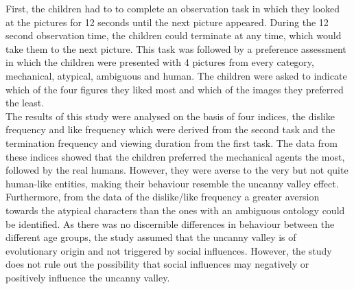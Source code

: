 First, the children had to to complete an observation task in which they looked at the pictures for 12 seconds until the next picture appeared. During the 12 second observation time, the children could terminate at any time, which would take them to the next picture. This task was followed by a preference assessment in which the children were presented with 4 pictures from every category, mechanical, atypical, ambiguous  and human. The children were asked to indicate which of the four figures they liked most and which of the images they preferred the least.\\
The results of this study were analysed on the basis of four indices, the dislike frequency and like frequency which were derived from the second task and the termination frequency and viewing duration from the first task.
The data from these indices showed that the children preferred the mechanical agents the most, followed by the real humans. 
However, they were averse to the very but not quite human-like entities, making their behaviour resemble the uncanny valley effect. Furthermore, from the data of the dislike/like frequency a greater aversion towards the atypical characters than the ones with an ambiguous ontology could be identified. As there was no discernible differences in behaviour between the different age groups, the study assumed that the uncanny valley is of evolutionary origin and not triggered by social influences. However, the study does not rule out the possibility that social influences may negatively or positively influence the uncanny valley.\\





